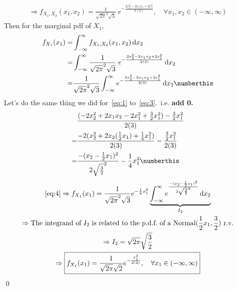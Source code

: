 \documentclass{mthe353answer}
\begin{document}
\begin{questions}
\begin{gather*}
    \Rightarrow 
    \boxed{f_{X_1,X_2}(x_1,x_2) = \frac{1}{\sqrt{2\pi}^2\sqrt{3}}\;e^{-\frac{2x_2^2-2x_1x_2+2x_1^2}{2(3)}},\quad \forall x_1,x_2 \in (-\infty,\infty)}
  \end{gather*}
  Then for the marginal pdf of \(X_1\),
  \begin{align*}
    f_{X_1}(x_1) =& \int_{-\infty}^{\infty} f_{X_1,X_2}(x_1,x_2) \,\mathrm{d}x_2\\
    =& \int_{-\infty}^{\infty} \frac{1}{\sqrt{2\pi}^2\sqrt{3}}\;e^{-\frac{2x_2^2-2x_1x_2+2x_1^2}{2(3)}} \,\mathrm{d}x_2 \\
    =& \frac{1}{\sqrt{2\pi}^2\sqrt{3}} \int_{-\infty}^{\infty} e^{-\frac{2x_2^2-2x_1x_2+2x_1^2}{2(3)}} \,\mathrm{d}x_2 \numberthis \label{eq:3}
  \end{align*}
  Let's do the same thing we did for~\eqref{eq:1} to~\eqref{eq:3}.\ i.e. \textbf{add 0.}
  \begin{align*}
     & \frac{(-2x_2^2+2x_1x_2-2x_1^2+\frac{3}{2}x_1^2)-\frac{3}{2}x_1^2}{2(3)}\\
    =& \frac{-2(x_2^2+2x_2(\frac{1}{2}x_1)+\frac{1}{4}x_1^2)}{2(3)}-\frac{\frac{3}{2}x_1^2}{2(3)}\\
    =& \frac{-(x_2-\frac{1}{2}x_1)^2}{2\sqrt{\frac{3}{2}}^2}-\frac{1}{4}x_1^2 \numberthis \label{eq:4}
  \end{align*}
  \begin{gather*}
    \text{\eqref{eq:4}} \Rightarrow f_{X_1}(x_1) = \frac{1}{\sqrt{2\pi}^2\sqrt{3}}e^{-\frac{1}{4}x_1^2} 
      \underbrace{\int_{-\infty}^{\infty} e^{\frac{-(x_2-\frac{1}{2}x_1)^2}{2\sqrt{\frac{3}{2}}^2}} \,\mathrm{d}x_2}_{I_2}\\
    \Rightarrow \text{The integrand of \(I_2\) is related to the p.d.f.\ of a Normal(\(\frac{1}{2}x_1, \frac{3}{2}\)) r.v.}\\
    \Rightarrow I_2 = \sqrt{2\pi}\sqrt{\frac{3}{2}}\\
    \Rightarrow \boxed{f_{X_1}(x_1) = \frac{1}{\sqrt{2\pi}\sqrt{2}}e^{-\frac{x_1^2}{2(2)}},\quad \forall x_1 \in (-\infty,\infty)}\\
  \end{gather*}
  \hfill\qed{}
\end{questions}
\end{document}

